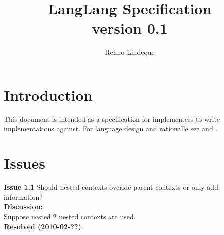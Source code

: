 \documentclass[11pt]{article}
\begin{document}
\title{LangLang Specification\\\small{version 0.1}}
\author{Rehno Lindeque}

\maketitle

\section{Introduction}
This document is intended as a specification for implementers to write implementations against. For language design and rationalle see \cite{ctxfoundation} and \cite{ctxrationalle}.

\section{Issues}
\textbf{Issue 1.1} Should nested contexts overide parent contexts or only add information?\\
\indent \textbf{Discussion:}\\
\indent \indent Suppose nested 2 nested contexts are used. \\
\indent \textbf{Resolved (2010-02-??)}


\end{document}
